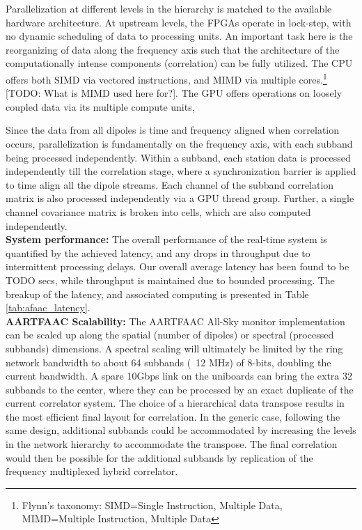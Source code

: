 \documentclass{ws-jai}
\begin{document}
Parallelization at different levels in the hierarchy is matched to the available
hardware architecture.  At upstream levels, the FPGAs operate in lock-step, with
no dynamic scheduling of data to processing units. An important task here is the
reorganizing of data along the frequency  axis such that the architecture of the
computationally intense components (correlation) can  be fully utilized. The CPU
offers   both  SIMD   via   vectored  instructions,   and   MIMD  via   multiple
cores.\footnote  {Flynn's  taxonomy:  SIMD=Single  Instruction,  Multiple  Data,
  MIMD=Multiple  Instruction,  Multiple Data}  [TODO:  What  is MIMD  used  here
  for?]. The  GPU offers  operations on  loosely coupled  data via  its multiple
compute units,

Since the data  from all dipoles is time and  frequency aligned when correlation
occurs,  parallelization  is fundamentally  on  the  frequency axis,  with  each
subband being processed  independently.  Within a subband, each  station data is
processed  independently till  the  correlation stage,  where a  synchronization
barrier is applied  to time align all  the dipole streams.  Each  channel of the
subband  correlation matrix  is also  processed independently  via a  GPU thread
group.  Further, a single channel covariance  matrix is broken into cells, which
are also computed independently.\\


\noindent \textbf {System performance:} The overall performance of the real-time
system is quantified by the achieved latency, and any drops in throughput due to
intermittent processing delays. Our overall average latency has been found to be
TODO secs, while throughput is maintained due to bounded processing. The breakup
of   the   latency,   and   associated   computing   is   presented   in   Table
\ref{tab:afaac_latency}.\\

\noindent  \textbf   {AARTFAAC  Scalability:}   The  AARTFAAC   All-Sky  monitor
implementation  can be  scaled  up  along the  spatial  (number  of dipoles)  or
spectral (processed subbands) dimensions. A  spectral scaling will ultimately be
limited by the ring network bandwidth to  about 64 subbands (~12 MHz) of 8-bits,
doubling the current  bandwidth. A spare 10Gbps link on  the uniboards can bring
the extra  32 subbands to the  center, where they  can be processed by  an exact
duplicate of the  current correlator system.  The choice of  a hierarchical data
transpose results  in the most efficient  final layout for correlation.   In the
generic  case,  following   the  same  design,  additional   subbands  could  be
accommodated by  increasing the levels  in the network hierarchy  to accommodate
the transpose.  The final correlation would  then be possible for the additional
subbands by replication of the frequency multiplexed hybrid correlator.
\end{document}

